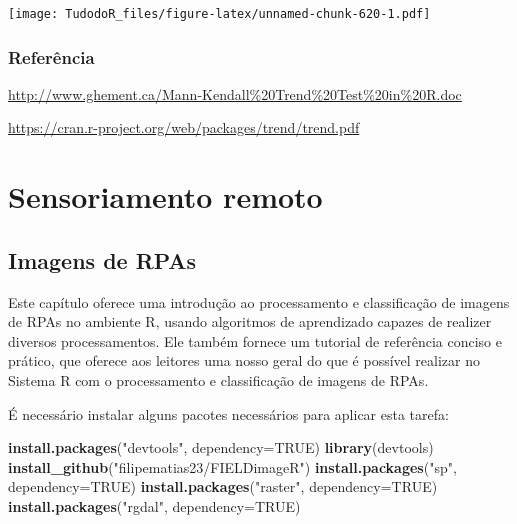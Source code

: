 \documentclass[
]{book}
\newenvironment{Shaded}{\begin{snugshade}}{\end{snugshade}}
\newcommand{\DataTypeTok}[1]{\textcolor[rgb]{0.13,0.29,0.53}{#1}}
\newcommand{\KeywordTok}[1]{\textcolor[rgb]{0.13,0.29,0.53}{\textbf{#1}}}
\newcommand{\NormalTok}[1]{#1}
\newcommand{\OtherTok}[1]{\textcolor[rgb]{0.56,0.35,0.01}{#1}}
\newcommand{\StringTok}[1]{\textcolor[rgb]{0.31,0.60,0.02}{#1}}
\begin{document}
\texttt{[image: TudodoR\_files/figure-latex/unnamed-chunk-620-1.pdf]}

\hypertarget{referuxeancia-8}{%
\subsection{Referência}\label{referuxeancia-8}}

\url{http://www.ghement.ca/Mann-Kendall\%20Trend\%20Test\%20in\%20R.doc}

\url{https://cran.r-project.org/web/packages/trend/trend.pdf}

\hypertarget{sensoriamento-remoto}{%
\chapter{Sensoriamento remoto}\label{sensoriamento-remoto}}

\hypertarget{imagens-de-rpas}{%
\section{Imagens de RPAs}\label{imagens-de-rpas}}

Este capítulo oferece uma introdução ao processamento e classificação de imagens de RPAs no ambiente R, usando algoritmos de aprendizado capazes de realizer diversos processamentos. Ele também fornece um tutorial de referência conciso e prático, que oferece aos leitores uma nosso geral do que é possível realizar no Sistema R com o processamento e classificação de imagens de RPAs.

É necessário instalar alguns pacotes necessários para aplicar esta tarefa:

\begin{Shaded}
\begin{Highlighting}[]
\KeywordTok{install.packages}\NormalTok{(}\StringTok{"devtools"}\NormalTok{, }\DataTypeTok{dependency=}\OtherTok{TRUE}\NormalTok{)}
\KeywordTok{library}\NormalTok{(devtools)}
\KeywordTok{install_github}\NormalTok{(}\StringTok{"filipematias23/FIELDimageR"}\NormalTok{)}
\KeywordTok{install.packages}\NormalTok{(}\StringTok{"sp"}\NormalTok{, }\DataTypeTok{dependency=}\OtherTok{TRUE}\NormalTok{)}
\KeywordTok{install.packages}\NormalTok{(}\StringTok{"raster"}\NormalTok{, }\DataTypeTok{dependency=}\OtherTok{TRUE}\NormalTok{)}
\KeywordTok{install.packages}\NormalTok{(}\StringTok{"rgdal"}\NormalTok{, }\DataTypeTok{dependency=}\OtherTok{TRUE}\NormalTok{)}
\end{Highlighting}
\end{Shaded}
\end{document}
